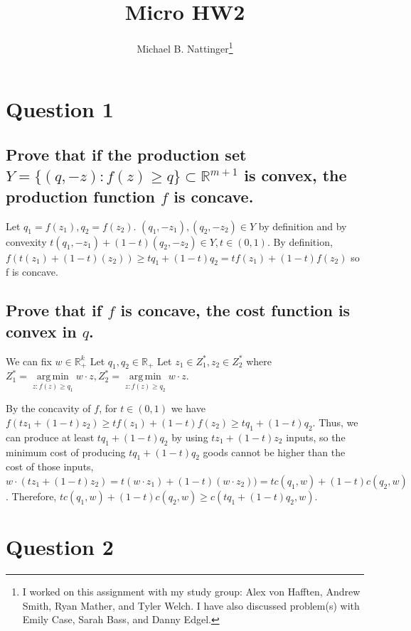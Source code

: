 \documentclass[11pt]{article} %
\title{Micro HW2}
\author{Michael B. Nattinger\footnote{I worked on this assignment with my study group: Alex von Hafften, Andrew Smith, Ryan Mather, and Tyler Welch. I have also discussed problem(s) with Emily Case, Sarah Bass, and Danny Edgel.}}
\DeclareMathOperator*{\argmin}{arg\,min}
\begin{document}
\maketitle

\section{Question 1}

\subsection{Prove that if the production set $Y = \{ (q,-z):f(z) \geq q \} \subset \mathbb{R}^{m+1}$ is convex, the production function $f$ is concave.}
Let $q_1 = f(z_1), q_2 = f(z_2)$. $(q_1,-z_1),(q_2,-z_2) \in Y$ by definition and by convexity $t(q_1,-z_1)+(1-t)(q_2,-z_2)\in Y,t\in(0,1)$. By definition, $f(t(z_1)+(1-t)(z_2)) \geq tq_1 + (1-t) q_2 = tf(z_1) + (1-t)f(z_2)$ so f is concave.

\subsection{Prove that if $f$ is concave, the cost function is convex in $q$.}
We can fix $w \in \mathbb{R}_{+}^{k}$ Let $q_1,q_2 \in \mathbb{R}_{+}$ Let $z_1\in Z^{*}_{1},z_2 \in Z^{*}_{2}$ where $Z^{*}_{1}=\argmin\limits_{z:f(z)\geq q_1} w \cdot z, Z^{*}_{2} = \argmin\limits_{z:f(z)\geq q_2} w \cdot z.$

By the concavity of $f$, for $t \in (0,1)$ we have $f(tz_1 + (1-t)z_2) \geq tf(z_1) + (1-t)f(z_2) \geq tq_1 + (1-t)q_2.$ Thus, we can produce at least $tq_1 + (1-t)q_2$ by using $tz_1 + (1-t)z_2$ inputs, so the minimum cost of producing $tq_1 + (1-t)q_2$ goods cannot be higher than the cost of those inputs, $w\cdot (tz_1 + (1-t)z_2) = t(w \cdot z_1) + (1-t) (w \cdot z_2)) = tc(q_1,w) + (1-t)c(q_2,w)$. Therefore, $ t c(q_1,w) + (1-t)c(q_2,w) \geq c(tq_1+ (1-t) q_2,w)$.

\section{Question 2}
\end{document}
